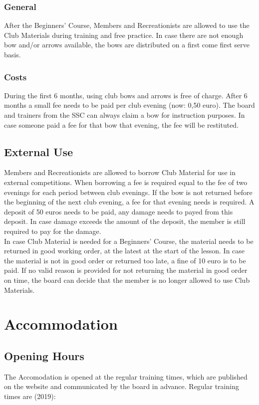 \documentclass[a4paper]{article}
\begin{document}
\subsubsection{General}
After the Beginners' Course, Members and Recreationists are allowed to use the Club Materials during training and free practice. In case there are not enough bow and/or arrows available, the bows are distributed on a first come first serve basis.

\subsubsection{Costs}
During the first 6 months, using club bows and arrows is free of charge. After 6 months a small fee needs to be paid per club evening (now: 0,50 euro). The board and trainers from the SSC can always claim a bow for instruction purposes. In case someone paid a fee for that bow that evening, the fee will be restituted.

\subsection{External Use}
Members and Recreationists are allowed to borrow Club Material for use in external competitions. When borrowing a fee is required equal to the fee of two evenings for each period between club evenings. If the bow is not returned before the beginning of the next club evening, a fee for that evening needs is required. A deposit of 50 euros needs to be paid, any damage needs to payed from this deposit. In case damage exceeds the amount of the deposit, the member is still required to pay for the damage. \\

In case Club Material is needed for a Beginners' Course, the material needs to be returned in good working order, at the latest at the start of the lesson. In case the material is not in good order or returned too late, a fine of 10 euro is to be paid. If no valid reason is provided for not returning the material in good order on time, the board can decide that the member is no longer allowed to use Club Materials.

\section{Accommodation}
\subsection{Opening Hours}
\label{section:opening}
The Accomodation is opened at the regular training times, which are published on the website and communicated by the board in advance. Regular training times are {\g (2019)}: \\
\end{document}
